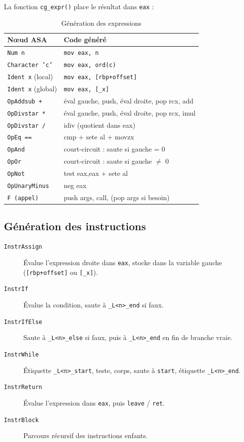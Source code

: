 \documentclass[12pt,a4paper]{article}
\begin{document}
La fonction \texttt{cg\_expr()} place le résultat dans \texttt{eax} :

\begin{table}[H]
\centering
\begin{tabularx}{\linewidth}{lX}
\toprule
\textbf{Nœud ASA} & \textbf{Code généré} \\
\midrule
\texttt{Num n}             & \texttt{mov eax, n} \\
\texttt{Character 'c'}     & \texttt{mov eax, ord(c)} \\
\texttt{Ident x} (local)   & \texttt{mov eax, [rbp+offset]} \\
\texttt{Ident x} (global)  & \texttt{mov eax, [\_x]} \\
\texttt{OpAddsub +}        & éval gauche, push, éval droite, pop rcx, add \\
\texttt{OpDivstar *}       & éval gauche, push, éval droite, pop rcx, imul \\
\texttt{OpDivstar /}       & idiv (quotient dans eax) \\
\texttt{OpEq ==}           & cmp + sete al + movzx \\
\texttt{OpAnd}             & court-circuit : saute si gauche = 0 \\
\texttt{OpOr}              & court-circuit : saute si gauche $\neq$ 0 \\
\texttt{OpNot}             & test eax,eax + sete al \\
\texttt{OpUnaryMinus}      & neg eax \\
\texttt{F (appel)}         & push args, call, (pop args si besoin) \\
\bottomrule
\end{tabularx}
\caption{Génération des expressions}
\end{table}

\subsection{Génération des instructions}

\begin{description}
  \item[\texttt{InstrAssign}] Évalue l'expression droite dans \texttt{eax}, stocke
        dans la variable gauche (\texttt{[rbp+offset]} ou \texttt{[\_x]}).
  \item[\texttt{InstrIf}] Évalue la condition, saute à \texttt{\_L<n>\_end} si faux.
  \item[\texttt{InstrIfElse}] Saute à \texttt{\_L<n>\_else} si faux, puis à
        \texttt{\_L<n>\_end} en fin de branche vraie.
  \item[\texttt{InstrWhile}] Étiquette \texttt{\_L<n>\_start}, teste, corps,
        saute à \texttt{start}, étiquette \texttt{\_L<n>\_end}.
  \item[\texttt{InstrReturn}] Évalue l'expression dans \texttt{eax}, puis
        \texttt{leave} / \texttt{ret}.
  \item[\texttt{InstrBlock}] Parcours récursif des instructions enfants.
\end{description}
\end{document}
